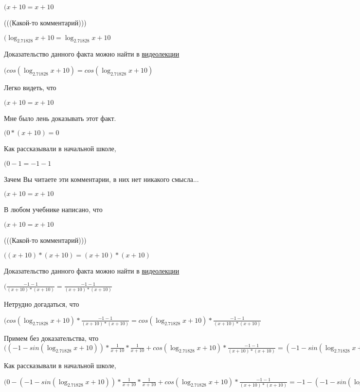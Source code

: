 \documentclass[12pt,a4paper,fleqn]{article}
\theoremstyle{definition}
\begin{document}
$( x  +  10  =  x  +  10 $

(((Какой-то комментарий)))

$(\log_{ 2.71828 }{ x  +  10 } = \log_{ 2.71828 }{ x  +  10 }$

Доказательство данного факта можно найти в \href{https://www.youtube.com/watch?v=dQw4w9WgXcQ}{видеолекции}

$(cos(\log_{ 2.71828 }{ x  +  10 }) = cos(\log_{ 2.71828 }{ x  +  10 })$

Легко видеть, что

$( x  +  10  =  x  +  10 $

Мне было лень доказывать этот факт.

$( 0  * ( x  +  10 ) =  0 $

Как рассказывали в начальной школе,

$( 0  -  1  =  -1  -  1 $

Зачем Вы читаете эти комментарии, в них нет никакого смысла...

$( x  +  10  =  x  +  10 $

В любом учебнике написано, что

$( x  +  10  =  x  +  10 $

(((Какой-то комментарий)))

$(( x  +  10 ) * ( x  +  10 ) = ( x  +  10 ) * ( x  +  10 )$

Доказательство данного факта можно найти в \href{https://www.youtube.com/watch?v=dQw4w9WgXcQ}{видеолекции}

$(\frac{ -1  -  1 }{( x  +  10 ) * ( x  +  10 )}
 = \frac{ -1  -  1 }{( x  +  10 ) * ( x  +  10 )}
$

Нетрудно догадаться, что

$(cos(\log_{ 2.71828 }{ x  +  10 }) * \frac{ -1  -  1 }{( x  +  10 ) * ( x  +  10 )}
 = cos(\log_{ 2.71828 }{ x  +  10 }) * \frac{ -1  -  1 }{( x  +  10 ) * ( x  +  10 )}
$

Примем без доказательства, что
$(( -1  - sin(\log_{ 2.71828 }{ x  +  10 })) * \frac{ 1 }{ x  +  10 }
 * \frac{ 1 }{ x  +  10 }
 + cos(\log_{ 2.71828 }{ x  +  10 }) * \frac{ -1  -  1 }{( x  +  10 ) * ( x  +  10 )}
 = ( -1  - sin(\log_{ 2.71828 }{ x  +  10 })) * \frac{ 1 }{ x  +  10 }
 * \frac{ 1 }{ x  +  10 }
 + cos(\log_{ 2.71828 }{ x  +  10 }) * \frac{ -1  -  1 }{( x  +  10 ) * ( x  +  10 )}
$

Как рассказывали в начальной школе,

$( 0  - ( -1  - sin(\log_{ 2.71828 }{ x  +  10 })) * \frac{ 1 }{ x  +  10 }
 * \frac{ 1 }{ x  +  10 }
 + cos(\log_{ 2.71828 }{ x  +  10 }) * \frac{ -1  -  1 }{( x  +  10 ) * ( x  +  10 )}
 =  -1  - ( -1  - sin(\log_{ 2.71828 }{ x  +  10 })) * \frac{ 1 }{ x  +  10 }
 * \frac{ 1 }{ x  +  10 }
 + cos(\log_{ 2.71828 }{ x  +  10 }) * \frac{ -1  -  1 }{( x  +  10 ) * ( x  +  10 )}
$
\end{document}

